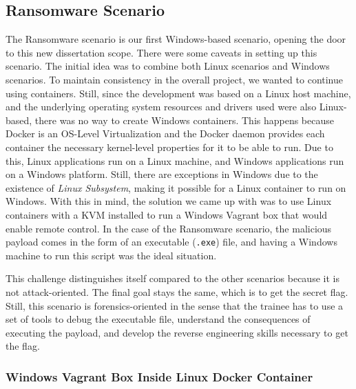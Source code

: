 \subsection{Ransomware Scenario} \label{sec:validation_ransomware_scenario}

The Ransomware scenario is our first Windows-based scenario, opening the door to this new dissertation scope. There were some caveats in setting up this scenario. The initial idea was to combine both Linux scenarios and Windows scenarios. To maintain consistency in the overall project, we wanted to continue using containers. Still, since the development was based on a Linux host machine, and the underlying operating system resources and drivers used were also Linux-based, there was no way to create Windows containers. This happens because Docker is an OS-Level Virtualization and the Docker daemon provides each container the necessary kernel-level properties for it to be able to run. Due to this, Linux applications run on a Linux machine, and Windows applications run on a Windows platform. Still, there are exceptions in Windows due to the existence of \textit{Linux Subsystem}, making it possible for a Linux container to run on Windows. With this in mind, the solution we came up with was to use Linux containers with a KVM installed to run a Windows Vagrant box that would enable remote control. In the case of the Ransomware scenario, the malicious payload comes in the form of an executable (\texttt{.exe}) file, and having a Windows machine to run this script was the ideal situation. 

This challenge distinguishes itself compared to the other scenarios because it is not attack-oriented. The final goal stays the same, which is to get the secret flag. Still, this scenario is forensics-oriented in the sense that the trainee has to use a set of tools to debug the executable file, understand the consequences of executing the payload, and develop the reverse engineering skills necessary to get the flag.

\subsubsection{Windows Vagrant Box Inside Linux Docker Container} \label{sec:validation_windows_vagrant_inside_linux_docker}

